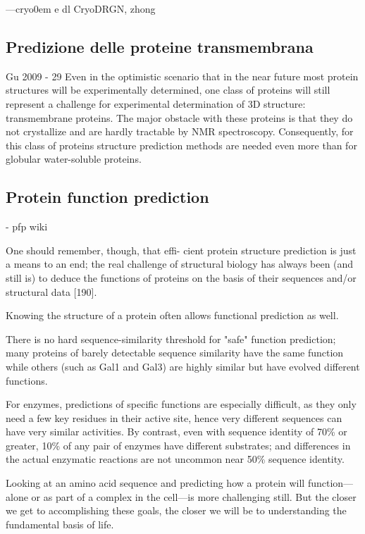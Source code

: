 ---cryo0em e dl
CryoDRGN, zhong

\subsection{Predizione delle proteine transmembrana}

Gu 2009 - 29
 Even in the optimistic scenario that in the near future most
protein structures will be experimentally determined, one class of proteins
will still represent a challenge for experimental determination of 3D
structure: transmembrane proteins. The major obstacle with these proteins
is that they do not crystallize and are hardly tractable by NMR
spectroscopy. Consequently, for this class of proteins structure prediction
methods are needed even more than for globular water-soluble proteins.

\subsection{Protein function prediction}
- pfp wiki

One should remember, though, that effi-
cient protein structure prediction is just a means to an end; the real challenge of structural
biology has always been (and still is) to deduce the functions of proteins on the basis of their
sequences and/or structural data [190].

Knowing the structure of a protein often allows functional prediction as well.

There is no hard sequence-similarity threshold for "safe" function prediction; many proteins of barely
detectable sequence similarity have the same function while others (such as Gal1 and Gal3) are highly
similar but have evolved different functions. 

For enzymes, predictions of specific functions are especially difficult, as they only need a few key residues
in their active site, hence very different sequences can have very similar activities. By contrast, even with
sequence identity of 70\% or greater, 10\% of any pair of enzymes have different substrates; and differences
in the actual enzymatic reactions are not uncommon near 50\% sequence identity.


Looking at an amino acid sequence and predicting how a protein will
function—alone or as part of a complex in the cell—is more challenging
still. But the closer we get to accomplishing these goals, the closer we
will be to understanding the fundamental basis of life.\supercite{alberts}

